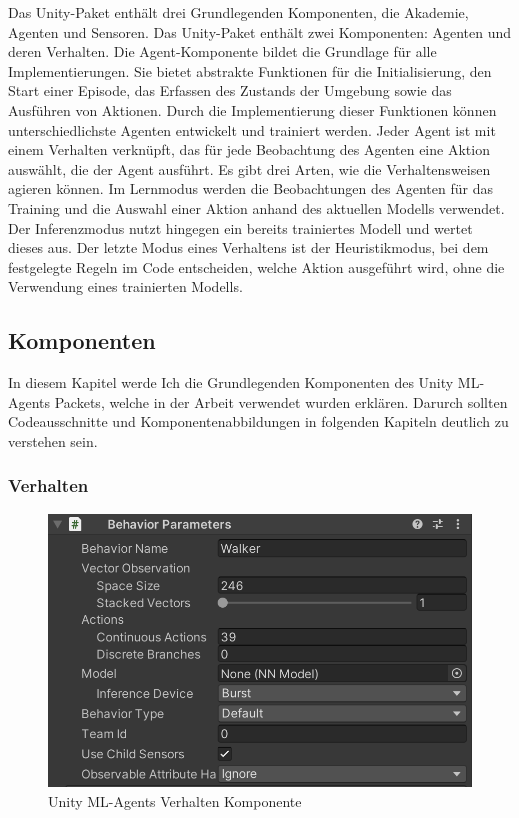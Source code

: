 Das Unity-Paket enthält drei Grundlegenden Komponenten, die Akademie, Agenten und Sensoren.
Das Unity-Paket enthält zwei Komponenten: Agenten und deren Verhalten. Die Agent-Komponente bildet die Grundlage für alle Implementierungen. Sie bietet abstrakte Funktionen für die Initialisierung, den Start einer Episode, das Erfassen des Zustands der Umgebung sowie das Ausführen von Aktionen. Durch die Implementierung dieser Funktionen können unterschiedlichste Agenten entwickelt und trainiert werden. Jeder Agent ist mit einem Verhalten verknüpft, das für jede Beobachtung des Agenten eine Aktion auswählt, die der Agent ausführt. Es gibt drei Arten, wie die Verhaltensweisen agieren können. Im Lernmodus werden die Beobachtungen des Agenten für das Training und die Auswahl einer Aktion anhand des aktuellen Modells verwendet. Der Inferenzmodus nutzt hingegen ein bereits trainiertes Modell und wertet dieses aus. Der letzte Modus eines Verhaltens ist der Heuristikmodus, bei dem festgelegte Regeln im Code entscheiden, welche Aktion ausgeführt wird, ohne die Verwendung eines trainierten Modells.\cite{juliani2020}

\subsection{Komponenten}
In diesem Kapitel werde Ich die Grundlegenden Komponenten des Unity ML-Agents Packets, welche in der Arbeit verwendet wurden erklären. Darurch sollten Codeausschnitte und Komponentenabbildungen in folgenden Kapiteln deutlich zu verstehen sein.

\subsubsection{Verhalten}
\begin{figure}[H]
  \centering  
  \includegraphics[scale=0.5]{img/verhalten_komponente.png}
  \caption{Unity ML-Agents Verhalten Komponente}
  \label{fig:verhalten_komponente}
\end{figure}

